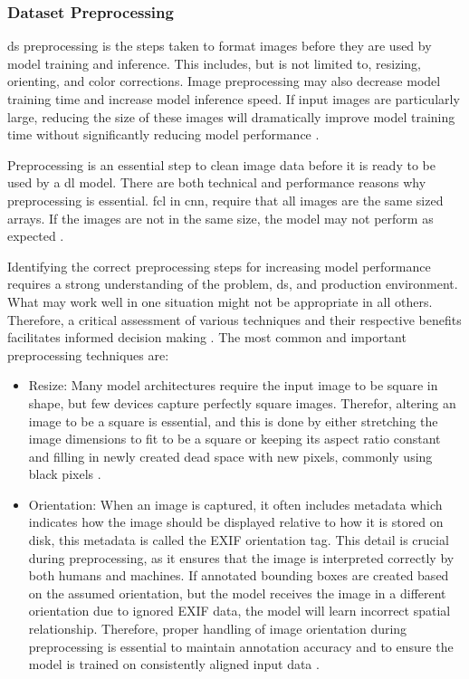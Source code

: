 \subsubsection{Dataset Preprocessing}
\gls{ds} preprocessing is the steps taken to format images before they are used by model training and inference. This includes, but is not limited to, resizing, orienting, and color corrections. Image preprocessing may also decrease model training time and increase model inference speed. If input images are particularly large, reducing the size of these images will dramatically improve model training time without significantly reducing model performance \cite{Preprocessing_Augmentation}.

Preprocessing is an essential step to clean image data before it is ready to be used by a \gls{dl} model. There are both technical and performance reasons why preprocessing is essential. \gls{fcl} in \gls{cnn}, require that all images are the same sized arrays. If the images are not in the same size, the model may not perform as expected \cite{Preprocessing_Augmentation}.

Identifying the correct preprocessing steps for increasing model performance requires a strong understanding of the problem, \gls{ds}, and production environment. What may work well in one situation might not be appropriate in all others. Therefore, a critical assessment of various techniques and their respective benefits facilitates informed decision making \cite{Preprocessing_Augmentation}. The most common and important preprocessing techniques are:
\begin{itemize}
    \item Resize: Many model architectures require the input image to be square in shape, but few devices capture perfectly square images. Therefor, altering an image to be a square is essential, and this is done by either stretching the image dimensions to fit to be a square or keeping its aspect ratio constant and filling in newly created dead space with new pixels, commonly using black pixels \cite{Preprocessing_Augmentation}.
    \item Orientation: When an image is captured, it often includes metadata which indicates how the image should be displayed relative to how it is stored on disk, this metadata is called the EXIF orientation tag. This detail is crucial during preprocessing, as it ensures that the image is interpreted correctly by both humans and machines. If annotated bounding boxes are created based on the assumed orientation, but the model receives the image in a different orientation due to ignored EXIF data, the model will learn incorrect spatial relationship. Therefore, proper handling of image orientation during preprocessing is essential to maintain annotation accuracy and to ensure the model is trained on consistently aligned input data \cite{Preprocessing_Augmentation}.
\end{itemize}

